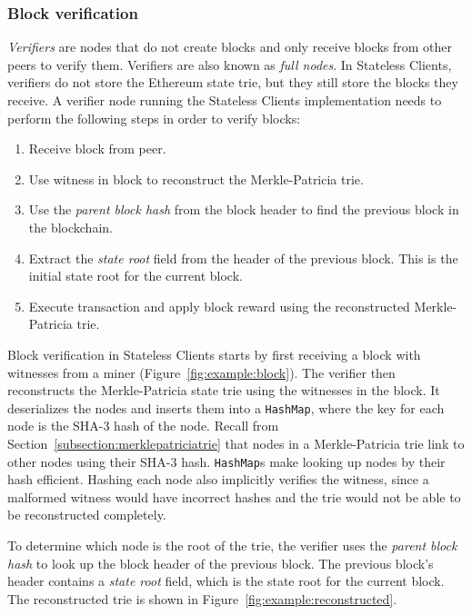 \documentclass[12pt]{article}
\newcommand{\System}{Stateless Clients\xspace}
\begin{document}
\subsubsection{Block verification}

\emph{Verifiers} are nodes that do not create blocks and only receive blocks from other peers to verify them. Verifiers are also known as \emph{full nodes}. In \System, verifiers do not store the Ethereum state trie, but they still store the blocks they receive. A verifier node running the \System implementation needs to perform the following steps in order to verify blocks:

\begin{enumerate}
  \item Receive block from peer.
  \item Use witness in block to reconstruct the Merkle-Patricia trie.
  \item Use the \emph{parent block hash} from the block header to find the previous block in the blockchain.
  \item Extract the \emph{state root} field from the header of the previous block. This is the initial state root for the current block.
  \item Execute transaction and apply block reward using the reconstructed Merkle-Patricia trie.
\end{enumerate}

Block verification in \System starts by first receiving a block with witnesses from a miner (Figure~\ref{fig:example:block}). The verifier then reconstructs the Merkle-Patricia state trie using the witnesses in the block. It deserializes the nodes and inserts them into a \texttt{HashMap}, where the key for each node is the SHA-3 hash of the node. Recall from Section~\ref{subsection:merklepatriciatrie} that nodes in a Merkle-Patricia trie link to other nodes using their SHA-3 hash. \texttt{HashMap}s make looking up nodes by their hash efficient. Hashing each node also implicitly verifies the witness, since a malformed witness would have incorrect hashes and the trie would not be able to be reconstructed completely.

To determine which node is the root of the trie, the verifier uses the \emph{parent block hash} to look up the block header of the previous block. The previous block's header contains a \emph{state root} field, which is the state root for the current block. The reconstructed trie is shown in Figure~\ref{fig:example:reconstructed}.
\end{document}
